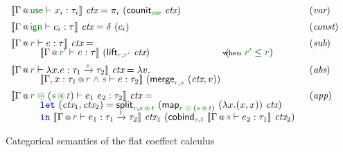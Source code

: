 \begin{figure*}[t]

\begin{equation*}
\begin{array}{ll}
\sem{\coctx{\Gamma}{\cunit} \vdash x_i : \tau_i }~\ctx =
  \pi_i~(\ident{counit}_{\cunit}~\ctx) & (\emph{var})
\\[0.5em]
\sem{\coctx{\Gamma}{\czero} \vdash c_i : \tau }~\ctx =
  \delta~(c_i) & (\emph{const})
\\[0.5em]
\sem{\coctx{\Gamma}{\cclrd{r}} \vdash e : \tau }~\ctx = & (\emph{sub})\\[-0.25em]
  \hspace{3em}\sem{\coctx{\Gamma}{\cclrd{r'}} \vdash e : \tau }~(\ident{lift}_{\cclrd{r}, \cclrd{r'}}~\ctx)~
    \hspace{7.5em}(\hspace{-0.7em}\textnormal{\footnotesize when}~\cclrd{r'} \leq \cclrd{r})
\\[0.5em]
\sem{\coctx{\Gamma}{\cclrd{r}} \vdash \lambda x.e : \tau_1 \xrightarrow{\cclrd{s}} \tau_2 }~\ctx = \lambda v.& (\emph{abs})\\[-0.25em]
  \hspace{3em}\sem{\coctx{\Gamma, x:\tau_1}{\cclrd{r}\;\czip\;\cclrd{s}} \vdash e : \tau_2}~(\ident{merge}_{\cclrd{r}, \cclrd{s}}~(\ctx, v))
\\[0.5em]
\sem{\coctx{\Gamma}{\cclrd{r} \;\cpar\; (\cclrd{s} \,\cseq\, \cclrd{t})} \vdash e_1~e_2 : \tau_2}~\ctx = & (\emph{app})\\[-0.25em]
  \hspace{2.5em}
  \begin{array}{l}  
  \kvd{let}~(\ctx_1, \ctx_2) = \ident{split}_{\cclrd{r}, \cclrd{s} \,\cseq\, \cclrd{t}}~
    (\ident{map}_{\cclrd{r} \;\cpar\; (\cclrd{s} \,\cseq\, \cclrd{t})}~(\lambda x.(x,x))~\ctx) \\[-0.25em]
  \kvd{in}~\sem{\coctx{\Gamma}{\cclrd{r}} \vdash e_1 : \tau_1 \xrightarrow{\cclrd{t}} \tau_2}~\ctx_1~
      (\ident{cobind}_{\cclrd{s}, \cclrd{t}}~\sem{\coctx{\Gamma}{\cclrd{s}} \vdash e_2 : \tau_1 }~\ctx_2)
  \end{array}    
\end{array}
\end{equation*}

\caption{Categorical semantics of the flat coeffect calculus}
\label{fig:flat-semantics}
\end{figure*}



